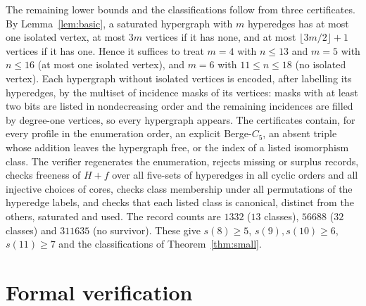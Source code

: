 \documentclass[11pt]{article}
\theoremstyle{remark}
\begin{document}
The remaining lower bounds and the classifications follow from three
certificates. By Lemma~\ref{lem:basic}, a saturated hypergraph with $m$
hyperedges has at most one isolated vertex, at most $3m$ vertices if it
has none, and at most $\lfloor3m/2\rfloor+1$ vertices if it has one. Hence it suffices to
treat $m=4$ with $n\le13$ and $m=5$ with $n\le16$ (at most one isolated
vertex), and $m=6$ with $11\le n\le18$ (no isolated vertex). Each
hypergraph without isolated vertices is encoded, after labelling its
hyperedges, by the multiset of incidence masks of its vertices: masks with
at least two bits are listed in nondecreasing order and the remaining
incidences are filled by degree-one vertices, so every hypergraph appears.
The certificates contain, for every profile in the enumeration order, an
explicit Berge-$C_5$, an absent triple whose addition leaves the
hypergraph free, or the index of a listed isomorphism class. The verifier
regenerates the enumeration, rejects missing or surplus records, checks
freeness of $H+f$ over all five-sets of hyperedges in all cyclic orders
and all injective choices of cores, checks class membership under all
permutations of the hyperedge labels, and checks that each listed class is
canonical, distinct from the others, saturated and used. The record counts
are $1332$ ($13$ classes), $56688$ ($32$ classes) and $311635$ (no
survivor). These give $s(8)\ge5$, $s(9),s(10)\ge6$, $s(11)\ge7$ and the
classifications of Theorem~\ref{thm:small}.

\section{Formal verification}\label{sec:lean}
\end{document}
